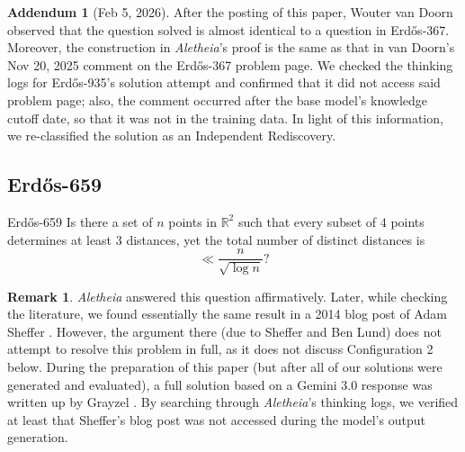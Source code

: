 \documentclass{article}
\theoremstyle{plain}
\theoremstyle{definition}
\newtheorem{remark}{Remark}[section]
\newtheorem{addendum}{Addendum}[section]
\newcommand{\Aletheia}{\emph{Aletheia}}
\begin{document}
\begin{addendum}[Feb 5, 2026] After the posting of this paper, Wouter van Doorn observed that the question solved is almost identical to a question in Erd\H{o}s-367. Moreover, the construction in {\Aletheia}'s proof is the same as that in van Doorn's Nov 20, 2025 comment on the Erd\H{o}s-367 problem page. We checked the thinking logs for Erd\H{o}s-935's solution attempt and confirmed that it did not access said problem page; also, the comment occurred after the base model's knowledge cutoff date, so that it was not in the training data. In light of this information, we re-classified the solution as an Independent Rediscovery. 
\end{addendum}


\subsection{Erdős-659}

\begin{problem}{Erdős-659 \cite{Er97e}}
    Is there a set of $n$ points in $\mathbb{R}^2$ such that every subset of $4$ points determines at least $3$ distances, yet the total number of distinct distances is\[\ll \frac{n}{\sqrt{\log n}}?\]
\end{problem}

\begin{remark}
{\Aletheia} answered this question affirmatively. Later, while checking the literature, we found essentially the same result in a 2014 blog post of Adam Sheffer \cite{sheffer2014point}. However, the argument there (due to Sheffer and Ben Lund) does not attempt to resolve this problem in full, as it does not discuss Configuration 2 below. During the preparation of this paper (but after all of our solutions were generated and evaluated), a full solution based on a Gemini 3.0 response was written up by Grayzel \cite{grayzel2026solutionproblemerdhosconcerning}. By searching through {\Aletheia}'s thinking logs, we verified at least that Sheffer's blog post was not accessed during the model's output generation.
\end{remark}
\end{document}
